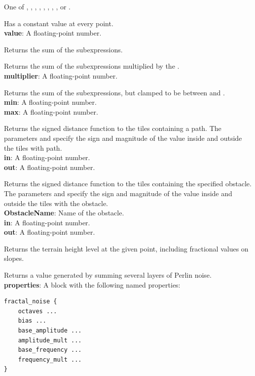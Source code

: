 One of , , , , , , , , or .

Has a constant value at every point.\\
\textbf{value}: A floating-point number.

Returns the sum of the subexpressions.

Returns the sum of the subexpressions multiplied by the .\\
\textbf{multiplier}: A floating-point number.

Returns the sum of the subexpressions, but clamped to be between  and .\\
\textbf{min}: A floating-point number.\\
\textbf{max}: A floating-point number.

Returns the signed distance function to the tiles containing a path.
The parameters  and  specify the sign and magnitude of the value inside and outside the tiles with path.\\
\textbf{in}: A floating-point number.\\
\textbf{out}: A floating-point number.

Returns the signed distance function to the tiles containing the specified obstacle.
The parameters  and  specify the sign and magnitude of the value inside and outside the tiles with the obstacle.\\
\textbf{ObstacleName}: Name of the obstacle.\\
\textbf{in}: A floating-point number.\\
\textbf{out}: A floating-point number.

Returns the terrain height level at the given point, including fractional values on slopes.

Returns a value generated by summing several layers of Perlin noise.\\
\textbf{properties}: A block with the following named properties:
\begin{verbatim}
fractal_noise {
    octaves ...
    bias ...
    base_amplitude ...
    amplitude_mult ...
    base_frequency ...
    frequency_mult ...
}
\end{verbatim}

